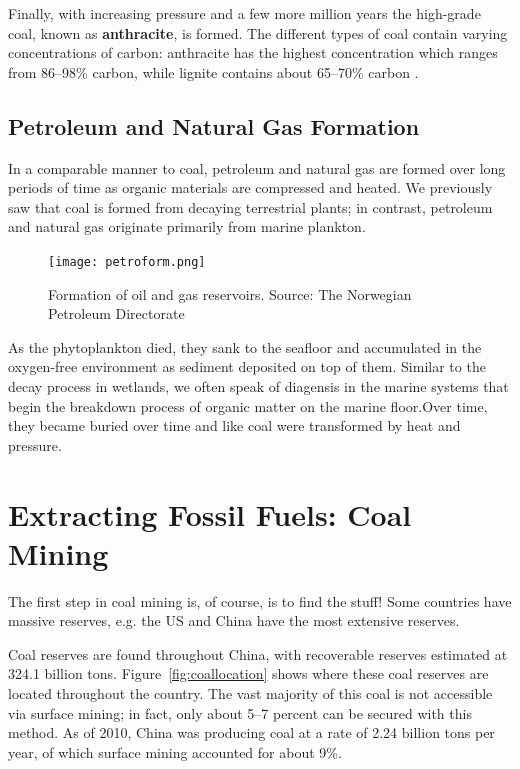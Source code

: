 Finally, with increasing pressure and a few more million years the high-grade coal, known as \textbf{anthracite}, is formed. The different types of coal contain varying concentrations of carbon: anthracite has the highest concentration which ranges from 86--98\% carbon, while lignite contains about 65--70\% carbon \citep{xie2015geological}.

\subsection{Petroleum and Natural Gas Formation}

In a comparable manner to coal, petroleum and natural gas are formed over long periods of time as organic materials are compressed and heated. We previously saw that coal is formed from decaying terrestrial plants; in contrast, petroleum and natural gas originate primarily from marine plankton.

\begin{figure}[ht]
\centering
    \texttt{[image: petroform.png]}
    \caption{Formation of oil and gas reservoirs. Source: The Norwegian Petroleum Directorate }
    \label{fig:petroform}
\end{figure}

As the phytoplankton died, they sank to the seafloor and accumulated in the oxygen-free environment as sediment deposited on top of them. Similar to the decay process in wetlands, we often speak of diagensis in the marine systems that begin the breakdown process of organic matter on the marine floor.Over time, they became buried over time and like coal were transformed by heat and pressure. 

\section{Extracting Fossil Fuels: Coal Mining}

The first step in coal mining is, of course, is to find the stuff!  Some countries have massive reserves, e.g. the US and China have the most extensive reserves. 

Coal reserves are found throughout China, with recoverable reserves estimated at 324.1 billion tons. Figure~\ref{fig:coallocation} shows where these coal reserves are located throughout the country. The vast majority of this coal is not accessible via surface mining; in fact, only about 5--7 percent can be secured with this method. As of 2010, China was producing coal at a rate of 2.24 billion tons per year, of which surface mining accounted for about 9\%. 

